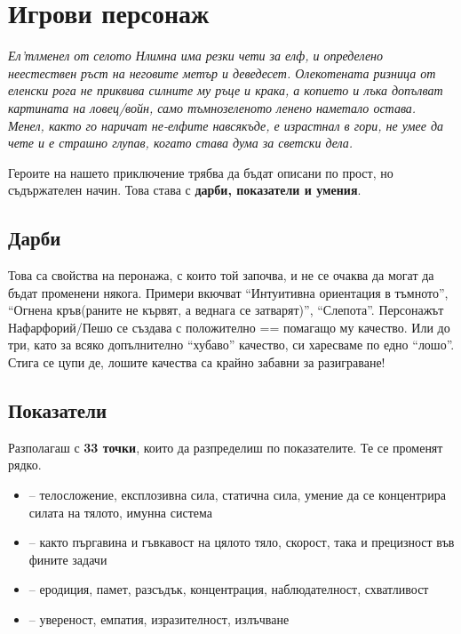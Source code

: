 
\section{Игрови персонаж}
\emph{Ел'тлменел от селото Нлимна има резки чети за елф, и определено неестествен ръст на неговите метър и деведесет.
Олекотената ризница от еленски рога не приквива силните му ръце и крака, а копието и лъка допълват картината на ловец/войн, само тъмнозеленото ленено наметало остава.
Менел, както го наричат не-елфите навсякъде, е израстнал в гори, не умее да чете и е страшно глупав, когато става дума за светски дела.}

Героите на нашето приключение трябва да бъдат описани по прост, но съдържателен начин.
Това става с \textbf{дарби, показатели и умения}.

\subsection{Дарби}
Това са свойства на перонажа, с които той започва, и не се очаква да могат да бъдат променени някога.
Примери вкючват “Интуитивна ориентация в тъмното”, “Огнена кръв(раните не кървят, а веднага се затварят)”, “Слепота”.
Персонажът Нафарфорий/Пешо се създава с { положително} == помагащо му качество.
Или до { три}, като за всяко допълнително “хубаво” качество, си харесваме по едно “лошо”. Стига се цупи де, лошите качества са крайно забавни за разиграване!

\subsection{Показатели}
Разполагаш с \textbf{33 точки}, които да разпределиш по показателите. Те се променят рядко.
\begin{itemize}
\item {} – телосложение, експлозивна сила, статична сила, умение да се концентрира силата на тялото, имунна система
\item {} – както пъргавина и гъвкавост на цялото тяло, скорост, така и прецизност във фините задачи
\item {} – еродиция, памет, разсъдък, концентрация, наблюдателност, схватливост
\item {} – увереност, емпатия, изразителност, излъчване
\end{itemize}

